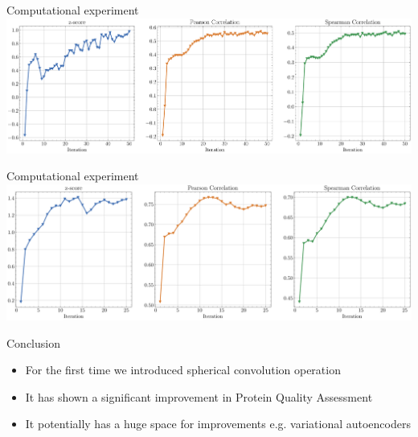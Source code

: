 \documentclass{beamer}
\begin{document}
\begin{frame}{Computational experiment}
    \includegraphics[width=1.0\textwidth]{img/z_score_casp12.pdf}
\end{frame}
\begin{frame}{Computational experiment}
    \includegraphics[width=1.0\textwidth]{img/z_score_casp12_sh.pdf}
\end{frame}
\begin{frame}{Conclusion}
        \begin{itemize}
            \item For the first time we introduced spherical convolution operation
            \item It has shown a significant improvement in Protein Quality Assessment
            \item It potentially has a huge space for improvements e.g. variational autoencoders
        \end{itemize}
\end{frame}
\end{document}
